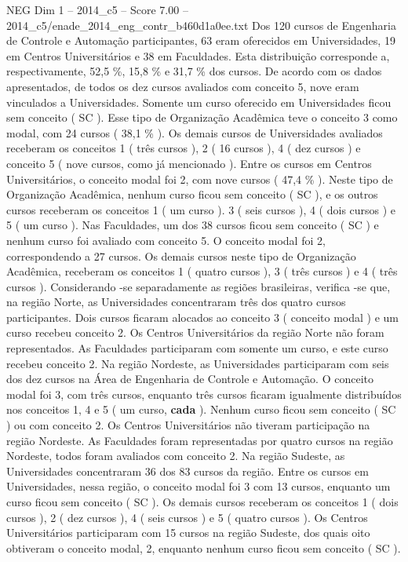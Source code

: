 \begin{textsample}{NEG Dim 1 – 2014\_c5 – Score 7.00 – 2014\_c5/enade\_2014\_eng\_contr\_b460d1a0ee.txt}
Dos 120 cursos de Engenharia de Controle e Automação participantes, 63 eram oferecidos em Universidades, 19 em Centros Universitários e 38 em Faculdades.
Esta distribuição corresponde a, respectivamente, 52,5 \%, 15,8 \% e 31,7 \% dos cursos.
De acordo com os dados apresentados, de todos os dez cursos avaliados com conceito 5, nove eram vinculados a Universidades.
Somente um curso oferecido em Universidades ficou sem conceito ( SC ).
Esse tipo de Organização Acadêmica teve o conceito 3 como modal, com 24 cursos ( 38,1 \% ).
Os demais cursos de Universidades avaliados receberam os conceitos 1 ( três cursos ), 2 ( 16 cursos ), 4 ( dez cursos ) e conceito 5 ( nove cursos, como já mencionado ).
Entre os cursos em Centros Universitários, o conceito modal foi 2, com nove cursos ( 47,4 \% ).
Neste tipo de Organização Acadêmica, nenhum curso ficou sem conceito ( SC ), e os outros cursos receberam os conceitos 1 ( um curso ). 3 ( seis cursos ), 4 ( dois cursos ) e 5 ( um curso ).
Nas Faculdades, um dos 38 cursos ficou sem conceito ( SC ) e nenhum curso foi avaliado com conceito 5.
O conceito modal foi 2, correspondendo a 27 cursos.
Os demais cursos neste tipo de Organização Acadêmica, receberam os conceitos 1 ( quatro cursos ), 3 ( três cursos ) e 4 ( três cursos ).
Considerando -se separadamente as regiões brasileiras, verifica -se que, na região Norte, as Universidades concentraram três dos quatro cursos participantes.
Dois cursos ficaram alocados ao conceito 3 ( conceito modal ) e um curso recebeu conceito 2.
Os Centros Universitários da região Norte não foram representados.
As Faculdades participaram com somente um curso, e este curso recebeu conceito 2.
Na região Nordeste, as Universidades participaram com seis dos dez cursos na Área de Engenharia de Controle e Automação.
O conceito modal foi 3, com três cursos, enquanto três cursos ficaram igualmente distribuídos nos conceitos 1, 4 e 5 ( um curso, \textbf{cada} ).
Nenhum curso ficou sem conceito ( SC ) ou com conceito 2.
Os Centros Universitários não tiveram participação na região Nordeste.
As Faculdades foram representadas por quatro cursos na região Nordeste, todos foram avaliados com conceito 2.
Na região Sudeste, as Universidades concentraram 36 dos 83 cursos da região.
Entre os cursos em Universidades, nessa região, o conceito modal foi 3 com 13 cursos, enquanto um curso ficou sem conceito ( SC ).
Os demais cursos receberam os conceitos 1 ( dois cursos ), 2 ( dez cursos ), 4 ( seis cursos ) e 5 ( quatro cursos ).
Os Centros Universitários participaram com 15 cursos na região Sudeste, dos quais oito obtiveram o conceito modal, 2, enquanto nenhum curso ficou sem conceito ( SC ).

\end{textsample}
